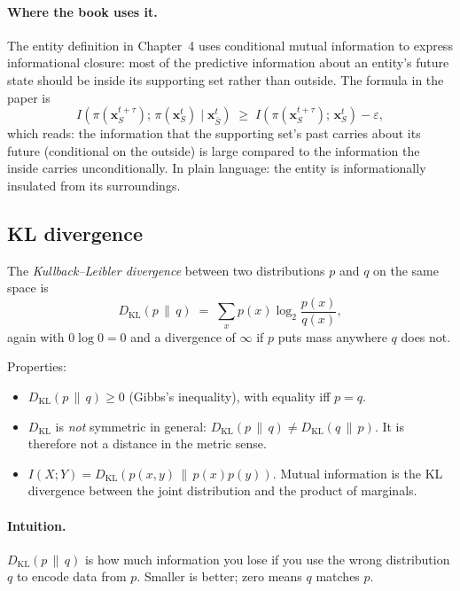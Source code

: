 \paragraph{Where the book uses it.} The entity definition in
Chapter~4 uses conditional mutual information to express
informational closure: most of the predictive information about an
entity's future state should be inside its supporting set rather
than outside. The formula in the paper is
\[
  I(\pi(\mathbf{x}_S^{t+\tau});\,
  \pi(\mathbf{x}_S^{t}) \mid \mathbf{x}_{\bar S}^{t})
  \;\geq\; I(\pi(\mathbf{x}_S^{t+\tau});\, \mathbf{x}_S^{t})
  - \varepsilon,
\]
which reads: the information that the supporting set's past carries
about its future (conditional on the outside) is large compared to
the information the inside carries unconditionally. In plain
language: the entity is informationally insulated from its
surroundings.

\subsection*{KL divergence}

The \emph{Kullback--Leibler divergence} between two distributions
$p$ and $q$ on the same space is
\[
  D_{\mathrm{KL}}(p \,\|\, q) \;=\; \sum_x p(x) \log_2 \frac{p(x)}{
  q(x)},
\]
again with $0 \log 0 = 0$ and a divergence of $\infty$ if $p$ puts
mass anywhere $q$ does not.

Properties:

\begin{itemize}[leftmargin=1.5em,itemsep=2pt]
  \item $D_{\mathrm{KL}}(p \,\|\, q) \geq 0$ (Gibbs's inequality),
    with equality iff $p = q$.
  \item $D_{\mathrm{KL}}$ is \emph{not} symmetric in general:
    $D_{\mathrm{KL}}(p \,\|\, q) \neq D_{\mathrm{KL}}(q \,\|\, p)$.
    It is therefore not a distance in the metric sense.
  \item $I(X; Y) = D_{\mathrm{KL}}(p(x,y) \,\|\, p(x) p(y))$. Mutual
    information is the KL divergence between the joint distribution
    and the product of marginals.
\end{itemize}

\paragraph{Intuition.} $D_{\mathrm{KL}}(p \,\|\, q)$ is how much
information you lose if you use the wrong distribution $q$ to encode
data from $p$. Smaller is better; zero means $q$ matches $p$.

